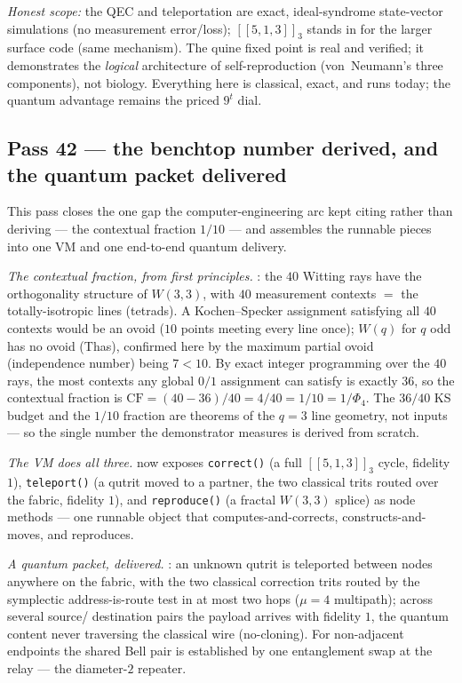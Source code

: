 \documentclass[11pt]{article}
\begin{document}
\emph{Honest scope:} the QEC and teleportation are exact, ideal-syndrome state-vector simulations (no
measurement error/loss); $[[5,1,3]]_3$ stands in for the larger surface code (same mechanism). The quine
fixed point is real and verified; it demonstrates the \emph{logical} architecture of self-reproduction
(von~Neumann's three components), not biology. Everything here is classical, exact, and runs today; the
quantum advantage remains the priced $9^t$ dial.

\subsection{Pass 42 --- the benchtop number derived, and the quantum packet delivered}
\label{sec:capstone-fortytwo}

This pass closes the one gap the computer-engineering arc kept citing rather than deriving --- the
contextual fraction $1/10$ --- and assembles the runnable pieces into one VM and one end-to-end
quantum delivery.

\emph{The contextual fraction, from first principles.} : the
$40$ Witting rays have the orthogonality structure of $W(3,3)$, with $40$ measurement contexts $=$ the
totally-isotropic lines (tetrads). A Kochen--Specker assignment satisfying all $40$ contexts would be an
ovoid ($10$ points meeting every line once); $W(q)$ for $q$ odd has no ovoid (Thas), confirmed here by
the maximum partial ovoid (independence number) being $7<10$. By exact integer programming over the
$40$ rays, the most contexts any global $0/1$ assignment can satisfy is exactly $36$, so the contextual
fraction is $\mathrm{CF}=(40-36)/40 = 4/40 = 1/10 = 1/\Phi_4$. The $36/40$ KS budget and the $1/10$
fraction are theorems of the $q=3$ line geometry, not inputs --- so the single number the demonstrator
measures is derived from scratch.

\emph{The VM does all three.}  now exposes \texttt{correct()} (a full
$[[5,1,3]]_3$ cycle, fidelity $1$), \texttt{teleport()} (a qutrit moved to a partner, the two classical
trits routed over the fabric, fidelity $1$), and \texttt{reproduce()} (a fractal $W(3,3)$ splice) as
node methods --- one runnable object that computes-and-corrects, constructs-and-moves, and reproduces.

\emph{A quantum packet, delivered.} : an unknown qutrit is
teleported between nodes anywhere on the fabric, with the two classical correction trits routed by the
symplectic address-is-route test in at most two hops ($\mu=4$ multipath); across several source/
destination pairs the payload arrives with fidelity $1$, the quantum content never traversing the
classical wire (no-cloning). For non-adjacent endpoints the shared Bell pair is established by one
entanglement swap at the relay --- the diameter-$2$ repeater.
\end{document}

